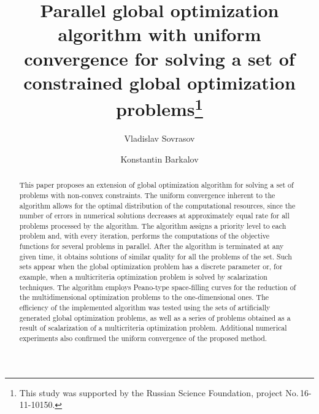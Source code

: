 \documentclass[runningheads]{llncs}
\begin{document}
%
\title{Parallel global optimization algorithm with uniform convergence
for solving a set of constrained global optimization problems\thanks{This study was supported
by the Russian Science Foundation, project No.\,16-11-10150.}}
%
%
\author{Vladislav Sovrasov\and
Konstantin Barkalov
}
%
%
%
\maketitle              %
%
\begin{abstract}
This paper proposes an extension of global optimization algorithm for solving a set of problems
with non-convex constraints. The uniform convergence inherent to the algorithm allows for the optimal
distribution of the computational resources, since the number of errors in numerical solutions
decreases at approximately equal rate for all problems processed by the algorithm. The algorithm assigns
a priority level to each problem and, with every iteration, performs the computations of the objective
functions for several problems in parallel. After the algorithm is terminated at any given time,
it obtains solutions of similar quality for all the problems of the set. Such sets appear when
the global optimization problem has a discrete parameter or, for example, when a multicriteria optimization
problem is solved by scalarization techniques. The algorithm employs Peano-type space-filling curves
for the reduction of the multidimensional optimization problems to the one-dimensional ones.
The efficiency of the implemented algorithm was tested using the sets of artificially generated
global optimization problems, as well as a series of problems obtained as a result of scalarization
of a multicriteria optimization problem. Additional numerical experiments also confirmed
the uniform convergence of the proposed method.

\end{abstract}
%
%
%
\end{document}
